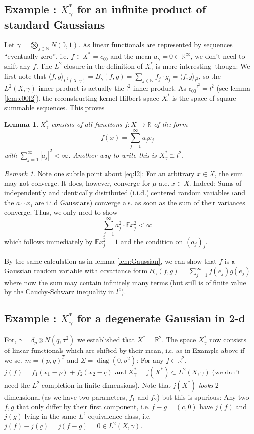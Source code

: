 \documentclass{scrartcl}
\newtheorem{lemma}{Lemma}
\theoremstyle{definition}
\theoremstyle{remark}
\newtheorem{remark}{Remark}
\newcommand{\N}{\mathbb N}
\newcommand{\R}{\mathbb R}
\newcommand{\E}{\mathbb E}
\newcommand*\circled[1]{\tikz[baseline=(char.base)]{
            \node[shape=circle,draw,inner sep=2pt] (char) {#1};}}
\DeclareRobustCommand{\myboxtwo}[2][blue!20]{%
\begin{tcolorbox}[   %
        breakable,
        left=0pt,
        right=0pt,
        top=0pt,
        bottom=0pt,
        colback=#1,
        colframe=#1,
        width=\dimexpr\textwidth\relax, 
        enlarge left by=0mm,
        boxsep=5pt,
        arc=10pt,outer arc=10pt,
        ]
        #2
\end{tcolorbox}
}
\begin{document}
\myboxtwo{
\subsection*{Example \circled{2}: $X_\gamma^*$ for an infinite product of standard Gaussians}
Let $\gamma =  \bigotimes_{j\in\N} N(0,1)$.  As linear functionals are represented by sequences ``eventually zero'', i.e. $f\in X^* = c_{00}$ and the mean $a_\gamma = 0\in\R^\infty$, we don't need to shift any $f$. The $L^2$ closure in the definition of $X_\gamma^*$ is more interesting, though: We first note that $\langle f,g\rangle_{L^2(X, \gamma)} = B_\gamma(f, g) = \sum_{j\in\N}f_j\cdot g_j = \langle f,g\rangle_{l^2}$, so the $L^2(X,\gamma)$ inner product is actually the $l^2$ inner product. As $\overline{c_{00}}^{l^2} = l^2$ (see lemma \ref{lem:c00l2}), the reconstructing kernel Hilbert space $X_\gamma^*$ is the space of square-summable sequences. This proves
\begin{lemma}
$X_\gamma^*$ consists of all functions $f:X\to \R$ of the form
\begin{equation}\label{eq:l2}
f(x) = \sum_{j=1}^\infty a_j x_j
\end{equation}
with $\sum_{j=1}^\infty |a_j|^2 < \infty$. Another way to write this is $X_\gamma^* \cong l^2$.
\end{lemma}
\begin{remark}
Note one subtle point about \eqref{eq:l2}: For an arbitrary $x\in X$, the sum may not converge. It does, however, converge for $\mu$-a.e. $x\in X$. Indeed: Sums of independently and identically distributed (i.i.d.) centered random variables (and the $a_j\cdot x_j$ are i.i.d Gaussians) converge a.s. as soon as the sum of their variances converge. Thus, we only need to show
\[ \sum_{j=1}^\infty a_j^2 \cdot \E x_j^2 < \infty \]
which follows immediately by $\E x_j^2 = 1$ and the condition on $(a_j)_j$.

By the same calculation as in lemma \ref{lem:Gaussian}, we can show that $f$ is a Gaussian random variable with covariance form $B_\gamma(f, g) = \sum_{j=1}^\infty f(e_j)g(e_j)$ where now the sum may contain infinitely many terms (but still is of finite value by the Cauchy-Schwarz inequality in $l^2$).
\end{remark} 


}
\myboxtwo{
\subsection*{Example \circled{3}: $X_\gamma^*$ for a degenerate Gaussian in 2-d}
For, $\gamma = \delta_p \otimes N(q, \sigma^2)$ we established that $X^* = \R^2$. The space $X_\gamma^*$ now consists of linear functionals which are shifted by their mean, i.e. as in Example \circled{1} above if we set $m = (p,q)^T$ and $\Sigma = \operatorname{diag}(0,\sigma^2)$: For any $f\in \R^2$, $j(f) = f_1(x_1-p) + f_2(x_2-q)$ and $X_\gamma^* = j(X^*)\subset L^2(X,\gamma)$ (we don't need the $L^2$ completion in finite dimensions). Note that $j(X^*)$ \emph{looks} 2-dimensional (as we have two parameters, $f_1$ and $f_2$) but this is spurious: Any two $f, g$ that only differ by their  first component, i.e. $f-g = (c, 0)$ have $j(f)$ and $j(g)$ lying in the same $L^2$ equivalence class, i.e. $j(f)-j(g) = j(f-g) = 0\in L^2(X,\gamma)$.
}
\end{document}
